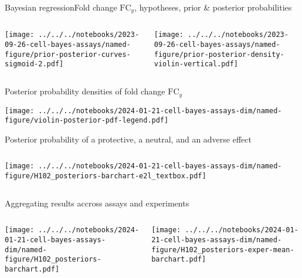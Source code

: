 \documentclass[aspectratio=169]{beamer}
\begin{document}
\begin{frame}{Bayesian regression}{Fold change $\mathrm{FC}_y$, hypotheses,
  prior \& posterior probabilities}
\begin{columns}[t]
\begin{column}{0.5\textwidth}

\texttt{[image: ../../../notebooks/2023-09-26-cell-bayes-assays/named-figure/prior-posterior-curves-sigmoid-2.pdf]}
\end{column}
\begin{column}{0.5\textwidth}

\texttt{[image: ../../../notebooks/2023-09-26-cell-bayes-assays/named-figure/prior-posterior-density-violin-vertical.pdf]}
\end{column}
\end{columns}
\end{frame}

\begin{frame}{Posterior probability densities of fold change $\mathrm{FC}_y$}
\begin{center}
\texttt{[image: ../../../notebooks/2024-01-21-cell-bayes-assays-dim/named-figure/violin-posterior-pdf-legend.pdf]}
\end{center}
\end{frame}

\begin{frame}{Posterior probability of a protective, a neutral, and an adverse effect}%
\begin{columns}[t]
\begin{column}{0.5\textwidth}

\texttt{[image: ../../../notebooks/2024-01-21-cell-bayes-assays-dim/named-figure/H102\_posteriors-barchart-e2l\_textbox.pdf]}
\end{column}

\begin{column}{0.5\textwidth}

\end{column}
\end{columns}
\end{frame}

\begin{frame}{Aggregating results accross assays and experiments}
\begin{columns}[t]
\begin{column}{0.5\textwidth}

\texttt{[image: ../../../notebooks/2024-01-21-cell-bayes-assays-dim/named-figure/H102\_posteriors-barchart.pdf]}
\end{column}

\begin{column}{0.5\textwidth}

\texttt{[image: ../../../notebooks/2024-01-21-cell-bayes-assays-dim/named-figure/H102\_posteriors-exper-mean-barchart.pdf]}
\end{column}
\end{columns}
\end{frame}
\end{document}
